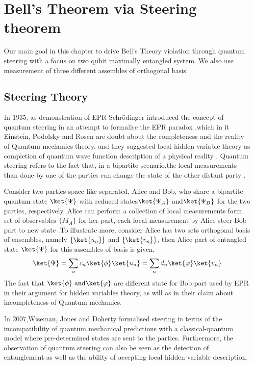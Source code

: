 \chapter{Bell's Theorem via Steering theorem}

Our main goal in this chapter to drive Bell's Theory violation through quantum steering with a focus on two qubit maximally entangled system. We also use measurement of three different assembles of orthogonal basis.
\section{Steering Theory}

In 1935, as demonstration of EPR Schrödinger introduced the concept of quantum steering in an attempt to formalise the EPR paradox \citep{schrodinger1935discussion},which in it Einstein, Podolsky and Rosen are doubt about the completeness and the reality of Quantum mechanics theory, and they suggested local hidden variable theory as completion of quantum wave function description of a physical reality \citep{EPR}. Quantum steering refers to the fact that, in a bipartite scenario,the local measurements than done by one of the parties can change the state of the other distant party .

Consider two parties space like separated, Alice and Bob, who share a bipartite quantum state $\ket{\Psi}$ with reduced states$\ket{\Psi_A}$ and$\ket{\Psi_B}$ for the two parties, respectively. Alice can perform a collection of local measurements form set of observables $\{M_A\}$ for her part, each local measurement by Alice steer Bob part to new state \citep{book:474706}.To illustrate more, consider Alice has two sets orthogonal basis of ensembles, namely $\{\ket{u_n}\}$ and $\{\ket{v_n}\}$, then Alice part of entangled state $\ket{\Psi}$ for this assembles of basis is given.
\begin{equation}
\ket{\Psi}=\sum_n c_n \ket{\phi} \ket{u_n}=\sum_n d_n \ket{\varphi}\ket{v_n}
\end{equation}
The fact that $\ket{\phi} \text{ and} \ket{\varphi}$ are different state for Bob part used by EPR in their argument for hidden variables theory, as will as in their claim about incompleteness of Quantum mechanics.

 In 2007,Wiseman, Jones and Doherty formalised steering in terms of the incompatibility of quantum mechanical predictions with a classical-quantum model where pre-determined states are sent to the parties. Furthermore, the observation of quantum steering can also be seen as the detection of entanglement as well as the ability of accepting local hidden variable description\cite{Jevtic:2015:10.1364/JOSAB.32.000A50}.





